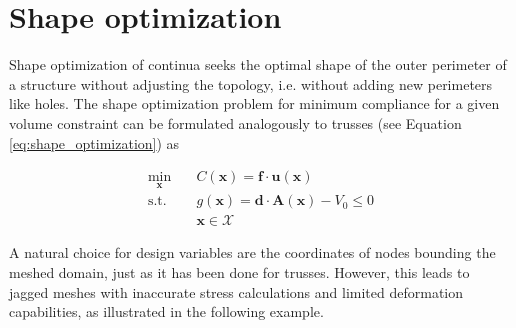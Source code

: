 
\section{Shape optimization}
Shape optimization of continua seeks the optimal shape of the outer perimeter of a structure without adjusting the topology, i.e. without adding new perimeters like holes. The shape optimization problem for minimum compliance for a given volume constraint can be formulated analogously to trusses (see Equation \eqref{eq:shape_optimization}) as 

\begin{equation}
    \begin{aligned}
        \min_{\mathbf{x}} \quad & C(\mathbf{x}) = \mathbf{f} \cdot \mathbf{u}(\mathbf{x})\\
        \textrm{s.t.} \quad & g(\mathbf{x}) = \mathbf{d} \cdot \mathbf{A}(\mathbf{x}) - V_0 \le 0  \\
                            & \mathbf{x} \in \mathcal{X}
    \end{aligned}
    \label{eq:shape_optimization_continuum}
\end{equation}

A natural choice for design variables are the coordinates of nodes bounding the meshed domain, just as it has been done for trusses. However, this leads to jagged meshes with inaccurate stress calculations and limited deformation capabilities, as illustrated in the following example.

